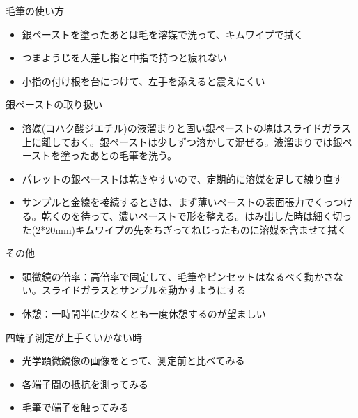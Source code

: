 毛筆の使い方
\begin{itemize}
\item 銀ペーストを塗ったあとは毛を溶媒で洗って、キムワイプで拭く
\item つまようじを人差し指と中指で持つと疲れない
\item 小指の付け根を台につけて、左手を添えると震えにくい
\end{itemize}

銀ペーストの取り扱い
\begin{itemize}
\item 溶媒(コハク酸ジエチル)の液溜まりと固い銀ペーストの塊はスライドガラス上に離しておく。銀ペーストは少しずつ溶かして混ぜる。液溜まりでは銀ペーストを塗ったあとの毛筆を洗う。
\item パレットの銀ペーストは乾きやすいので、定期的に溶媒を足して練り直す
\item サンプルと金線を接続するときは、まず薄いペーストの表面張力でくっつける。乾くのを待って、濃いペーストで形を整える。はみ出した時は細く切った(2*20mm)キムワイプの先をちぎってねじったものに溶媒を含ませて拭く
\end{itemize}

その他
\begin{itemize}
\item 顕微鏡の倍率：高倍率で固定して、毛筆やピンセットはなるべく動かさない。スライドガラスとサンプルを動かすようにする
\item 休憩：一時間半に少なくとも一度休憩するのが望ましい
\end{itemize}

四端子測定が上手くいかない時
\begin{itemize}
\item 光学顕微鏡像の画像をとって、測定前と比べてみる
\item 各端子間の抵抗を測ってみる
\item 毛筆で端子を触ってみる
\end{itemize}
